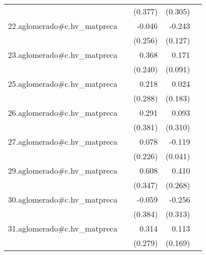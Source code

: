 {\begin{longtable}{l*{4}{D{.}{.}{-1}}}
            &                     &     (0.377)         &     (0.305)         &                     \\
\addlinespace
22.aglomerado#c.hv\_matpreca&                     &      -0.046         &      -0.243         &                     \\
            &                     &     (0.256)         &     (0.127)         &                     \\
\addlinespace
23.aglomerado#c.hv\_matpreca&                     &       0.368         &       0.171         &                     \\
            &                     &     (0.240)         &     (0.091)         &                     \\
\addlinespace
25.aglomerado#c.hv\_matpreca&                     &       0.218         &       0.024         &                     \\
            &                     &     (0.288)         &     (0.183)         &                     \\
\addlinespace
26.aglomerado#c.hv\_matpreca&                     &       0.291         &       0.093         &                     \\
            &                     &     (0.381)         &     (0.310)         &                     \\
\addlinespace
27.aglomerado#c.hv\_matpreca&                     &       0.078         &      -0.119\sym{**} &                     \\
            &                     &     (0.226)         &     (0.041)         &                     \\
\addlinespace
29.aglomerado#c.hv\_matpreca&                     &       0.608         &       0.410         &                     \\
            &                     &     (0.347)         &     (0.268)         &                     \\
\addlinespace
30.aglomerado#c.hv\_matpreca&                     &      -0.059         &      -0.256         &                     \\
            &                     &     (0.384)         &     (0.313)         &                     \\
\addlinespace
31.aglomerado#c.hv\_matpreca&                     &       0.314         &       0.113         &                     \\
            &                     &     (0.279)         &     (0.169)         &                     \\

\end{longtable}}
